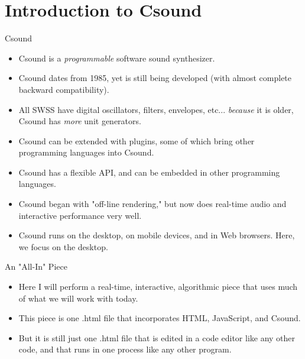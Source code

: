 \documentclass{beamer}
\begin{document}
    \section{Introduction to Csound}
    \begin{frame}{Csound}
        \begin{itemize}
            \item Csound is a \textit{programmable} software sound synthesizer.
            \item Csound dates from 1985, yet is still being developed (with almost
            complete backward compatibility).
            \item All SWSS have digital oscillators, filters, envelopes, etc...
            \textit{because} it is older, Csound has \textit{more} unit generators.
            \item Csound can be extended with plugins, some of which bring other
            programming languages into Csound. 
            \item Csound has a flexible API, and can be embedded in other
            programming languages.
            \item Csound began with "off-line rendering," but now does real-time
            audio and interactive performance very well.
            \item Csound runs on the desktop, on mobile devices, and in Web
            browsers. Here, we focus on the desktop. 
        \end{itemize}
    \end{frame}
    \begin{frame}{An "All-In" Piece}
        \begin{itemize}
            \item Here I will perform a real-time, interactive, algorithmic piece
            that uses much of what we will work with today.
            \item This piece is one .html file that incorporates  HTML, JavaScript, and Csound.
            \item But it is still just one .html file that is edited in a code editor
            like any other code, and that runs in one process like any other program.
        \end{itemize}
    \end{frame}
\end{document}
